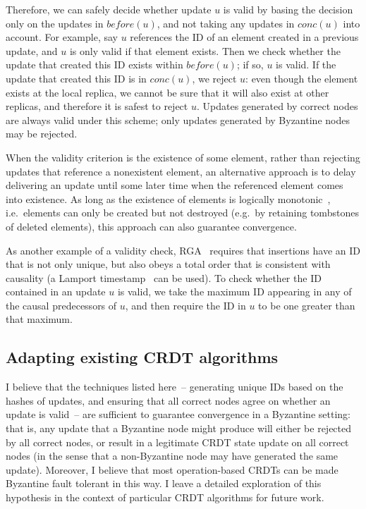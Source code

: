 \documentclass[sigplan,review]{acmart}
\begin{document}
Therefore, we can safely decide whether update $u$ is valid by basing the decision only on the updates in $\mathit{before}(u)$, and not taking any updates in $\mathit{conc}(u)$ into account.
For example, say $u$ references the ID of an element created in a previous update, and $u$ is only valid if that element exists.
Then we check whether the update that created this ID exists within $\mathit{before}(u)$; if so, $u$ is valid.
If the update that created this ID is in $\mathit{conc}(u)$, we reject $u$: even though the element exists at the local replica, we cannot be sure that it will also exist at other replicas, and therefore it is safest to reject $u$.
Updates generated by correct nodes are always valid under this scheme; only updates generated by Byzantine nodes may be rejected.

When the validity criterion is the existence of some element, rather than rejecting updates that reference a nonexistent element, an alternative approach is to delay delivering an update until some later time when the referenced element comes into existence.
As long as the existence of elements is logically monotonic~\cite{Alvaro:2011}, i.e.\ elements can only be created but not destroyed (e.g.\ by retaining tombstones of deleted elements), this approach can also guarantee convergence.

As another example of a validity check, RGA~\cite{Roh:2011} requires that insertions have an ID that is not only unique, but also obeys a total order that is consistent with causality (a Lamport timestamp~\cite{Lamport:1978} can be used).
To check whether the ID contained in an update $u$ is valid, we take the maximum ID appearing in any of the causal predecessors of $u$, and then require the ID in $u$ to be one greater than that maximum.

\subsection{Adapting existing CRDT algorithms}

I believe that the techniques listed here~-- generating unique IDs based on the hashes of updates, and ensuring that all correct nodes agree on whether an update is valid~-- are sufficient to guarantee convergence in a Byzantine setting: that is, any update that a Byzantine node might produce will either be rejected by all correct nodes, or result in a legitimate CRDT state update on all correct nodes (in the sense that a non-Byzantine node may have generated the same update).
Moreover, I believe that most operation-based CRDTs can be made Byzantine fault tolerant in this way.
I leave a detailed exploration of this hypothesis in the context of particular CRDT algorithms for future work.
\end{document}
